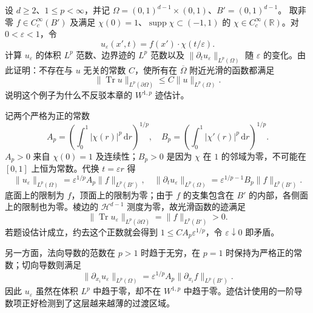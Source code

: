 \begin{exercise}\label{b1:ex:23-boundary-concentration}
设 \(d\ge2\)、\(1\le p<\infty\)，并记
\(\Omega=(0,1)^{d-1}\times(0,1)\)、\(B'=(0,1)^{d-1}\)。
取非零 \(f\in C_c^\infty(B')\) 及满足 \(\chi(0)=1\)、\(\operatorname{supp}\chi\subset(-1,1)\) 的 \(\chi\in C_c^\infty(\mathbb R)\)。对 \(0<\varepsilon<1\)，令
\[
 u_\varepsilon(x',t)=f(x')\cdot\chi(t/\varepsilon).
\]
计算 \(u_\varepsilon\) 的体积 \(L^p\) 范数、边界迹的 \(L^p\) 范数以及
\(\|\partial_tu_\varepsilon\|_{L^p(\Omega)}\) 随 \(\varepsilon\) 的变化。由此证明：不存在与 \(u\) 无关的常数 \(C\)，使所有在 \(\overline\Omega\) 附近光滑的函数都满足
\[
 \|\operatorname{Tr}u\|_{L^p(\partial\Omega)}
 \le C\|u\|_{L^p(\Omega)}.
\]
说明这个例子为什么不反驳本章的 \(W^{1,p}\) 迹估计。
\end{exercise}
\begin{solution}
记两个严格为正的常数
\[
 A_p=\left(\int_0^1|\chi(r)|^p\,\mathrm dr\right)^{1/p},
 \quad
 B_p=\left(\int_0^1|\chi'(r)|^p\,\mathrm dr\right)^{1/p}.
\]
\(A_p>0\) 来自 \(\chi(0)=1\) 及连续性；\(B_p>0\) 是因为 \(\chi\) 在 \(1\) 的邻域为零，不可能在 \([0,1]\) 上恒为常数。代换 \(t=\varepsilon r\) 得
\[
 \|u_\varepsilon\|_{L^p(\Omega)}
   =\varepsilon^{1/p}A_p\|f\|_{L^p(B')},
 \quad
 \|\partial_tu_\varepsilon\|_{L^p(\Omega)}
   =\varepsilon^{1/p-1}B_p\|f\|_{L^p(B')}.
\]
底面上的限制为 \(f\)，顶面上的限制为零；由于 \(f\) 的支集包含在 \(B'\) 的内部，各侧面上的限制也为零。棱边的 \(\mathcal H^{d-1}\) 测度为零，故光滑函数的迹满足
\[
 \|\operatorname{Tr}u_\varepsilon\|_{L^p(\partial\Omega)}
 =\|f\|_{L^p(B')}>0.
\]
若题设估计成立，约去这个正数就会得到
\(1\le C A_p\varepsilon^{1/p}\)，令 \(\varepsilon\downarrow0\) 即矛盾。

另一方面，法向导数的范数在 \(p>1\) 时趋于无穷，在 \(p=1\) 时保持为严格正的常数；切向导数则满足
\[
 \|\partial_{x_i}u_\varepsilon\|_{L^p(\Omega)}
 =\varepsilon^{1/p}A_p\|\partial_{x_i}f\|_{L^p(B')}.
\]
因此 \(u_\varepsilon\) 虽然在体积 \(L^p\) 中趋于零，却不在 \(W^{1,p}\) 中趋于零。迹估计使用的一阶导数项正好检测到了这层越来越薄的过渡区域。
\end{solution}


